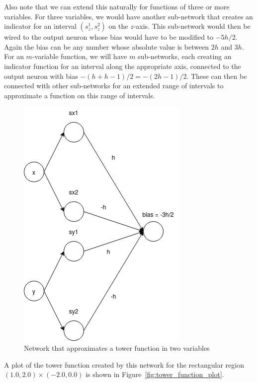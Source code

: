 Also note that we can extend this naturally for functions of three or more variables. For three 
variables, we would have another sub-network that creates an indicator for an interval 
$(s_z^1, s_z^2)$ on the $z$-axis. This sub-network would then be wired to the output neuron whose
bias would have to be modified to $-5h/2$. Again the bias can be any number whose absolute value 
is between $2h$ and $3h$. For an $m$-variable function, we will have $m$ sub-networks, each 
creating an indicator function for an interval along the appropriate axis, connected 
to the output neuron with bias $- (h + h - 1)/2 = - (2h - 1) / 2$. These can then be connected 
with other sub-networks for an extended range of intervals to approximate a function on this
range of intervals.     
\begin{figure}[ht]
\begin{center}
\includegraphics[scale=0.5]{TowerFunction.jpg}
\end{center}
\caption{Network that approximates a tower function in two variables}
\label{fig:tower_function}
\end{figure}
A plot of the tower function created by this network for the rectangular 
region $(1.0, 2.0) \times (-2.0, 0.0)$ is shown in Figure~\ref{fig:tower_function_plot}.
